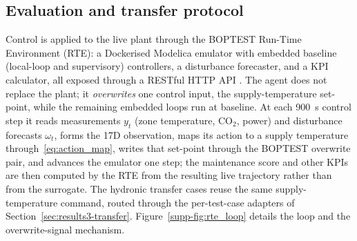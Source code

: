 \documentclass[a4paper,fleqn]{cas-sc}
\newcommand{\suppref}[1]{\ref{supp-#1}}
\begin{document}
\subsection{Evaluation and transfer protocol}\label{ssec:m-eval}
Control is applied to the live plant through the BOPTEST Run-Time Environment (RTE): a Dockerised Modelica emulator with embedded baseline (local-loop and supervisory) controllers, a disturbance forecaster, and a KPI calculator, all exposed through a RESTful HTTP API \citep{Blum2021BOPTEST}. The agent does not replace the plant; it \emph{overwrites} one control input, the supply-temperature set-point, while the remaining embedded loops run at baseline. At each \SI{900}{\second} control step it reads measurements $y_t$ (zone temperature, CO$_2$, power) and disturbance forecasts $\omega_t$, forms the 17D observation, maps its action to a supply temperature through~\eqref{eq:action_map}, writes that set-point through the BOPTEST overwrite pair, and advances the emulator one step; the maintenance score and other KPIs are then computed by the RTE from the resulting live trajectory rather than from the surrogate. The hydronic transfer cases reuse the same supply-temperature command, routed through the per-test-case adapters of Section~\ref{sec:results3-transfer}. Figure~\suppref{fig:rte_loop} details the loop and the overwrite-signal mechanism.
\end{document}

